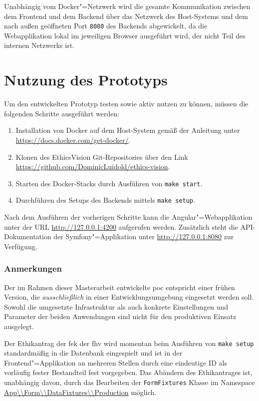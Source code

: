 \documentclass[a4paper,12pt,twoside]{scrreprt}
\begin{document}
Unabhängig vom Docker"=Netzwerk wird die gesamte Kommunikation zwischen dem Frontend und dem Backend über das Netzwerk des Host-Systems und dem nach außen geöffneten Port \texttt{8080} des Backends abgewickelt, da die Webapplikation lokal im jeweiligen Browser ausgeführt wird, der nicht Teil des internen Netzwerks ist.

\section{Nutzung des Prototyps}
\label{section:nutzung-prototyp}

Um den entwickelten Prototyp testen sowie aktiv nutzen zu können, müssen die folgenden Schritte ausgeführt werden:

\begin{enumerate}
    \item Installation von Docker auf dem Host-System gemäß der Anleitung unter \url{https://docs.docker.com/get-docker/}.
    \item Klonen des EthicsVision Git-Repositories über den Link \url{https://github.com/DominicLuidold/ethics-vision}.
    \item Starten des Docker-Stacks durch Ausführen von \texttt{make start}.
    \item Durchführen des Setups des Backends mittels \texttt{make setup}.
\end{enumerate}

\noindent Nach dem Ausführen der vorherigen Schritte kann die Angular"=Webapplikation unter der URL \url{http://127.0.0.1:4200} aufgerufen werden. Zusätzlich steht die API-Dokumentation der Symfony"=Applikation unter \url{http://127.0.0.1:8080} zur Verfügung.

\subsubsection*{Anmerkungen}
Der im Rahmen dieser Masterarbeit entwickelte \ac{poc} entspricht einer frühen Version, die \textit{ausschließlich} in einer Entwicklungsumgebung eingesetzt werden soll. Sowohl die umgesetzte Infrastruktur als auch konkrete Einstellungen und Parameter der beiden Anwendungen sind nicht für den produktiven Einsatz ausgelegt.

\medskip

Der Ethikantrag der \acl{fek} der \acl{fhv} wird momentan beim Ausführen von \texttt{make setup} standardmäßig in die Datenbank eingespielt und ist in der Frontend"=Applikation an mehreren Stellen durch eine eindeutige ID als vorläufig fester Bestandteil fest vorgegeben. Das Abändern des Ethikantrages ist, unabhängig davon, durch das Bearbeiten der \texttt{FormFixtures} Klasse im Namespace \url{App\\Form\\DataFixtures\\Production} möglich.
\end{document}

